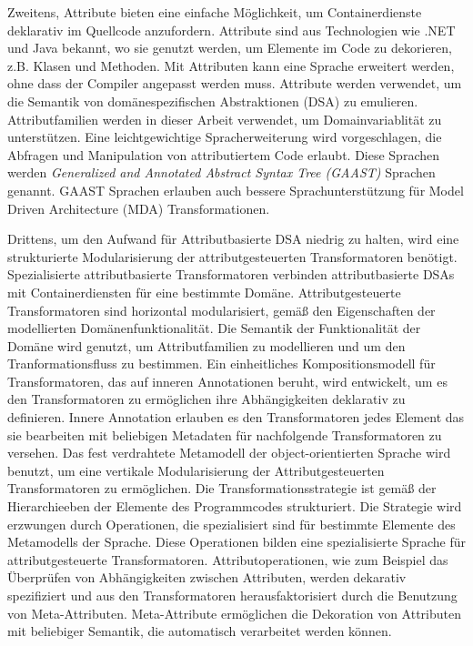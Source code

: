 Zweitens, Attribute bieten eine einfache M\"{o}glichkeit, um  Containerdienste deklarativ im Quellcode  anzufordern. Attribute sind aus Technologien
wie .NET und Java bekannt, wo sie genutzt werden, um Elemente im Code zu dekorieren,
z.B. Klasen und Methoden. Mit Attri\-bu\-ten kann eine Sprache erweitert werden, ohne dass der Compiler angepasst werden muss. Attribute werden verwendet, um die Semantik von dom\"{a}nespezifischen Abstraktionen (DSA) zu emulieren. Attributfamilien werden in dieser Arbeit verwendet, um Domainvariablit\"{a}t zu unterst\"{u}tzen. Eine leichtgewichtige  
Spracherweiterung wird vorgeschlagen, die Abfragen und Manipulation von attributiertem Code erlaubt. Diese Sprachen werden \textit{Generalized and Annotated Abstract Syntax Tree (GAAST)} Sprachen genannt. GAAST Sprachen erlauben auch bessere Sprachunterst\"{u}tzung f\"{u}r Model Driven Architecture (MDA) Transformationen.

Drittens, um den Aufwand f\"{u}r Attributbasierte DSA niedrig zu halten, wird eine strukturierte Modularisierung der attributgesteuerten Transformatoren ben\"{o}tigt. Spezialisierte attri\-but\-ba\-sierte Transfor\-ma\-to\-ren verbinden attributbasierte DSAs mit Containerdiensten f\"{u}r eine bestimmte Dom\"{a}ne. Attributgesteuerte Transformatoren sind horizontal modularisiert, gem\"{a}{\ss} den Eigenschaften der modellierten Dom\"{a}nenfunktionalit\"{a}t. Die Semantik der Funktionalit\"{a}t der Dom\"{a}ne wird genutzt, um Attributfamilien zu modellieren und um den Tranformationsfluss zu bestimmen. Ein einheitliches Kompositionsmodell f\"{u}r Trans\-for\-ma\-to\-ren, das auf inne\-ren Anno\-ta\-tionen beruht, wird entwickelt, um es den Transformatoren zu erm\"{o}glichen ihre Abh\"{a}ngigkeiten deklarativ zu definieren. Innere Annotation erlauben es den Transformatoren jedes Element das sie bearbeiten mit beliebigen Metadaten f\"{u}r nachfolgende Transformatoren zu versehen. Das fest verdrahtete Metamodell der object-orientierten Sprache wird benutzt, um eine vertikale Modularisierung der Attributgesteuerten Transformatoren zu erm\"{o}glichen. 
Die Transfor\-ma\-tions\-stra\-te\-gie ist gem\"{a}{\ss} der Hierarchieeben der Ele\-men\-te des Programmcodes strukturiert. Die Strategie wird erzwungen durch Operationen, die spezialisiert sind f\"{u}r bestimmte Ele\-me\-nte des Me\-ta\-mo\-dells der Sprache. Diese Operationen bilden eine spezialisierte Sprache f\"{u}r attributgesteuerte Transformatoren. Attributoperationen, wie zum Beispiel das \"{U}berpr\"{u}fen von Abh\"{a}ngigkeiten zwischen Attributen, werden dekarativ spezifiziert und aus den Transformatoren herausfaktorisiert durch die Benutzung von Meta-Attributen. Meta-Attribute erm\"{o}glichen die Dekoration von Attributen mit beliebiger Semantik, die automatisch verarbeitet werden k\"{o}nnen.  


